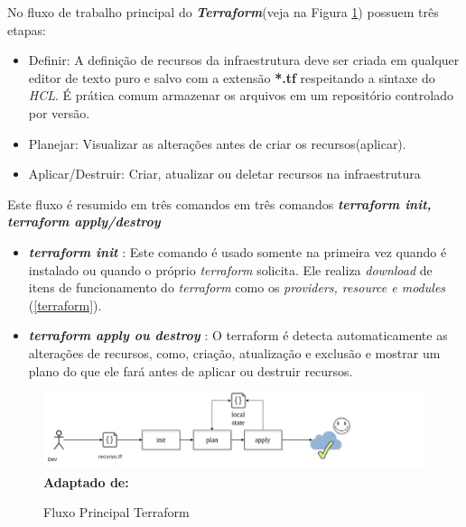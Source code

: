 No fluxo de trabalho principal do \textbf{\textit{Terraform}}(veja na Figura \ref{fig:figura7}) possuem três etapas:

\begin{itemize}
  \item Definir: A definição de recursos da infraestrutura deve ser criada em qualquer editor de texto puro e salvo com a extensão \textbf{*.tf} respeitando a sintaxe do \textit{HCL}. É prática comum armazenar os arquivos em um repositório controlado por versão.
   \item Planejar: Visualizar as alterações antes de criar os recursos(aplicar).
   \item Aplicar/Destruir: Criar, atualizar ou deletar recursos na infraestrutura 
\end{itemize}


Este fluxo é resumido em três comandos  em três comandos \textbf{\textit{terraform init, terraform apply/destroy}}


\begin{itemize}

\item \textbf{\textit{terraform init }}: Este comando é usado somente na primeira vez quando é instalado ou quando o próprio \textit{terraform} solicita. Ele realiza \textit{download} de itens de funcionamento do \textit{terraform} como os \textit{providers, resource e modules} (\ref{terraform}). 

\item \textbf{\textit{terraform apply ou destroy }}: O terraform é detecta automaticamente as alterações de recursos, como, criação, atualização e exclusão e mostrar um plano do que ele fará antes de aplicar ou destruir recursos.

\end{itemize}

\begin{figure}[ht]
	\centering	
	\caption[\hspace{0.1cm}Fluxo Principal Terraform]{Fluxo Principal Terraform}
	\vspace{-0.4cm}
	\includegraphics[width=1.2\textwidth]{artigo/figuras/terraform_single_workflow.png}
	 \vspace{-0.2cm}
	\\\textbf{\footnotesize Adaptado de: \cite{Turbinskii}}
	\label{fig:figura7}
\end{figure}
\vspace{-0.5cm}

